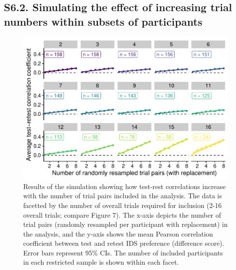 \documentclass[
  english,
  man, donotrepeattitle,floatsintext]{apa6}
\begin{document}
\hypertarget{s6.2.-simulating-the-effect-of-increasing-trial-numbers-within-subsets-of-participants}{%
\subsection{S6.2. Simulating the effect of increasing trial numbers within subsets of participants}\label{s6.2.-simulating-the-effect-of-increasing-trial-numbers-within-subsets-of-participants}}

\begin{figure}
\centering
\includegraphics{MB1T_supplement_files/figure-latex/fig8-1.pdf}
\caption{\label{fig:fig8}Results of the simulation showing how test-rest correlations increase with the number of trial pairs included in the analysis. The data is facetted by the number of overall trials required for inclusion (2-16 overall trials; compare Figure 7). The x-axis depicts the number of trial pairs (randomly resampled per participant with replacement) in the analysis, and the y-axis shows the mean Pearson correlation coefficient between test and retest IDS preference (difference score). Error bars represent 95\% CIs. The number of included participants in each restricted sample is shown within each facet.}
\end{figure}
\end{document}
